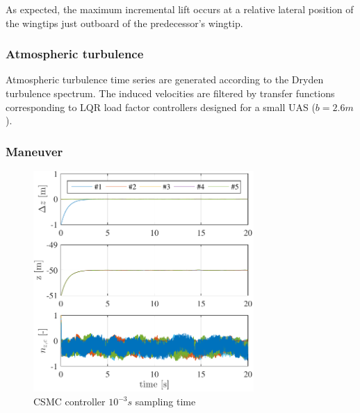 \documentclass{ifacconf}
\begin{document}
As expected, the maximum incremental lift occurs at a relative lateral position of the wingtips just outboard of the predecessor's wingtip.

\subsubsection{Atmospheric turbulence}
Atmospheric turbulence time series are generated according to the Dryden turbulence spectrum. The induced velocities are filtered by transfer functions corresponding to LQR load factor controllers designed for a small UAS ($b=2.6m$).

\subsubsection{Maneuver}



\begin{figure}
\begin{center}
\includegraphics[width=8.4cm]{STSMC-1000Hz-TIMESCALESEPARATION-turbulence=1}    %
\caption{CSMC controller $10^{-3} s$ sampling time} 
\label{fig:CSMC1000Hz}
\end{center}
\end{figure}
\end{document}
